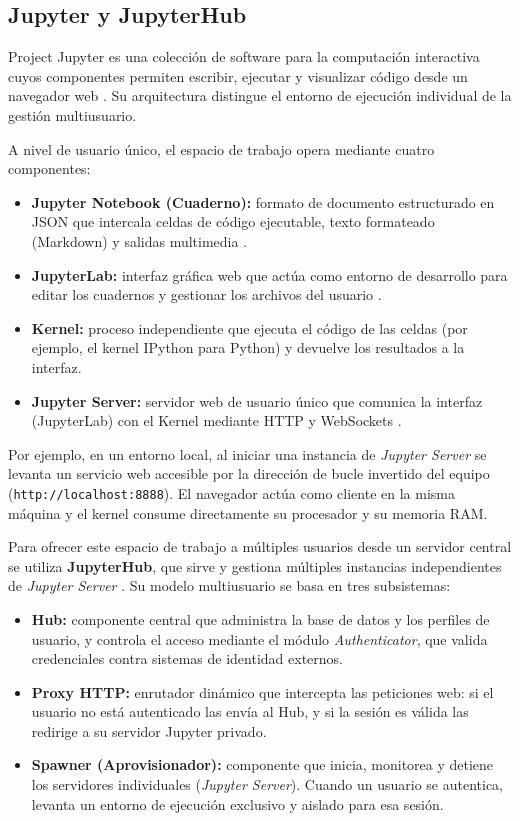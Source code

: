 \subsection{Jupyter y JupyterHub}
\label{subsec:jupyter_jupyterhub}

Project Jupyter es una colección de software para la computación interactiva cuyos componentes permiten escribir, ejecutar y visualizar código desde un navegador web \cite{jupyter_docs_2024}. Su arquitectura distingue el entorno de ejecución individual de la gestión multiusuario.

A nivel de usuario único, el espacio de trabajo opera mediante cuatro componentes:
\begin{itemize}
    \item \textbf{Jupyter Notebook (Cuaderno):} formato de documento estructurado en JSON que intercala celdas de código ejecutable, texto formateado (Markdown) y salidas multimedia \cite{jupyter_docs_2024}.
    \item \textbf{JupyterLab:} interfaz gráfica web que actúa como entorno de desarrollo para editar los cuadernos y gestionar los archivos del usuario \cite{jupyterlab_docs_2024}.
    \item \textbf{Kernel:} proceso independiente que ejecuta el código de las celdas (por ejemplo, el kernel IPython para Python) y devuelve los resultados a la interfaz.
    \item \textbf{Jupyter Server:} servidor web de usuario único que comunica la interfaz (JupyterLab) con el Kernel mediante HTTP y WebSockets \cite{jupyter_server_docs_2024}.
\end{itemize}

Por ejemplo, en un entorno local, al iniciar una instancia de \textit{Jupyter Server} se levanta un servicio web accesible por la dirección de bucle invertido del equipo (\texttt{http://localhost:8888}). El navegador actúa como cliente en la misma máquina y el kernel consume directamente su procesador y su memoria RAM.

Para ofrecer este espacio de trabajo a múltiples usuarios desde un servidor central se utiliza \textbf{JupyterHub}, que sirve y gestiona múltiples instancias independientes de \textit{Jupyter Server} \cite{jupyterhub_docs_2024}. Su modelo multiusuario se basa en tres subsistemas:

\begin{itemize}
    \item \textbf{Hub:} componente central que administra la base de datos y los perfiles de usuario, y controla el acceso mediante el módulo \textit{Authenticator}, que valida credenciales contra sistemas de identidad externos.
    \item \textbf{Proxy HTTP:} enrutador dinámico que intercepta las peticiones web: si el usuario no está autenticado las envía al Hub, y si la sesión es válida las redirige a su servidor Jupyter privado.
    \item \textbf{Spawner (Aprovisionador):} componente que inicia, monitorea y detiene los servidores individuales (\textit{Jupyter Server}). Cuando un usuario se autentica, levanta un entorno de ejecución exclusivo y aislado para esa sesión.
\end{itemize}


